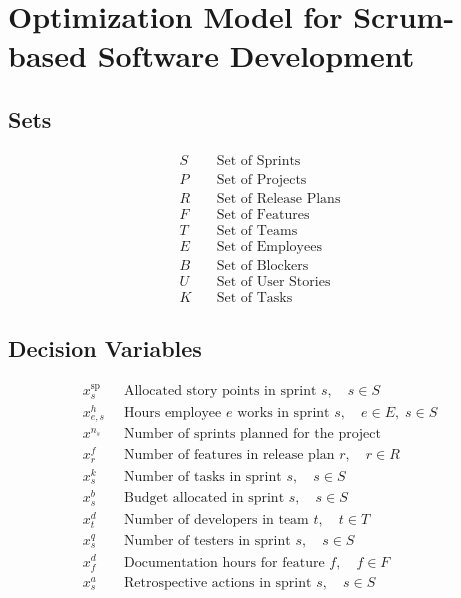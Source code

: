 \documentclass{article}
\begin{document}
\section*{Optimization Model for Scrum-based Software Development}

\subsection*{Sets}
\begin{align*}
S &\quad \text{Set of Sprints}\\
P &\quad \text{Set of Projects}\\
R &\quad \text{Set of Release Plans}\\
F &\quad \text{Set of Features}\\
T &\quad \text{Set of Teams}\\
E &\quad \text{Set of Employees}\\
B &\quad \text{Set of Blockers}\\
U &\quad \text{Set of User Stories}\\
K &\quad \text{Set of Tasks}
\end{align*}

\subsection*{Decision Variables}
\begin{align*}
x_{s}^{\text{sp}} &\;\; \text{Allocated story points in sprint } s, \quad s \in S \\
x_{e,s}^{h} &\;\; \text{Hours employee } e \text{ works in sprint } s,\quad e\in E,\;s\in S\\
x^{n_s} &\;\; \text{Number of sprints planned for the project}\\
x_{r}^{f} &\;\; \text{Number of features in release plan } r,\quad r \in R\\
x_{s}^{k} &\;\; \text{Number of tasks in sprint } s,\quad s \in S\\
x_{s}^{b} &\;\; \text{Budget allocated in sprint } s,\quad s \in S\\
x_{t}^{d} &\;\; \text{Number of developers in team } t,\quad t \in T\\
x_{s}^{q} &\;\; \text{Number of testers in sprint } s,\quad s \in S\\
x_{f}^{d} &\;\; \text{Documentation hours for feature } f,\quad f \in F\\
x_{s}^{a} &\;\; \text{Retrospective actions in sprint } s,\quad s \in S
\end{align*}
\end{document}
